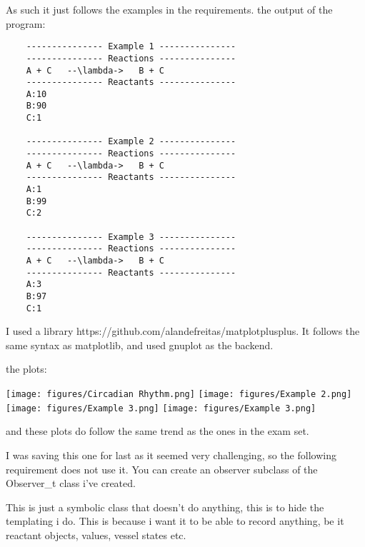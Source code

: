 As such it just follows the examples in the requirements. the output of the program:

\begin{lstlisting}
    --------------- Example 1 ---------------
    --------------- Reactions ---------------
    A + C   --\lambda->   B + C
    --------------- Reactants ---------------
    A:10
    B:90
    C:1
    
    --------------- Example 2 ---------------
    --------------- Reactions ---------------
    A + C   --\lambda->   B + C
    --------------- Reactants ---------------
    A:1
    B:99
    C:2
    
    --------------- Example 3 ---------------
    --------------- Reactions ---------------
    A + C   --\lambda->   B + C
    --------------- Reactants ---------------
    A:3
    B:97
    C:1
\end{lstlisting}


I used a library https://github.com/alandefreitas/matplotplusplus. It follows the same syntax as matplotlib, and used gnuplot as the backend.

the plots:

\texttt{[image: figures/Circadian Rhythm.png]}
\texttt{[image: figures/Example 2.png]}
\texttt{[image: figures/Example 3.png]}
\texttt{[image: figures/Example 3.png]}

and these plots do follow the same trend as the ones in the exam set.


I was saving this one for last as it seemed very challenging, so the following requirement does not use it. You can create an observer subclass of the Observer_t class i've created.

This is just a symbolic class that doesn't do anything, this is to hide the templating i do. This is because i want it to be able to record anything, be it reactant objects, values, vessel states etc.

